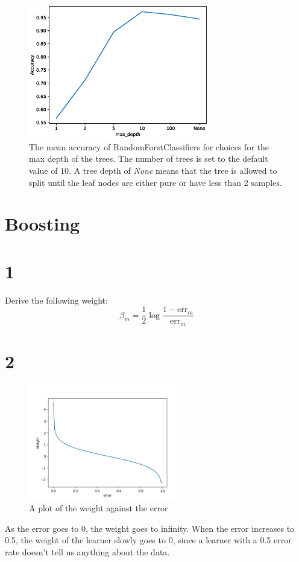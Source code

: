 \documentclass[11pt]{article}
\begin{document}
\begin{figure}[H]
\centering
\includegraphics[width=0.7\textwidth]{images/mnist_lines.eps}
\caption{The mean accuracy of RandomForstClassifiers for choices for the max depth of the trees. The number of trees is set to the default value of $10$. A tree depth of \textit{None} means that the tree is allowed to split until the leaf nodes are either pure or have less than 2 samples.}
\label{fig:mnist_lines}
\end{figure}

\section*{Boosting}

\section*{1}

Derive the following weight:
\[
	\beta_m = \frac{1}{2} \log \frac{1-\text{err}_m}{\text{err}_m}
\]

\section*{2}

\begin{figure}[h]
	\centering
	\includegraphics[width=0.6\textwidth]{images/ex2_2}
	\caption{A plot of the weight against the error}
\end{figure}
As the error goes to 0, the weight goes to infinity. When the error increases to 0.5, the weight of the learner slowly goes to 0, since a learner with a 0.5 error rate doesn't tell us anything about the data. 
\end{document}
